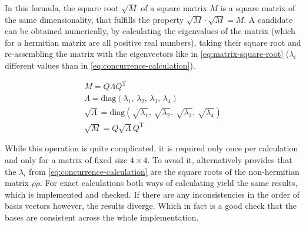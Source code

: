 In this formula, the square root $\sqrt{M}$ of a square matrix $M$ is a square matrix of the same dimensionality, that fulfills the property $\sqrt{M}\cdot \sqrt{M} = M$.
A candidate can be obtained numerically, by calculating the eigenvalues of the matrix (which for a hermitian matrix are all positive real numbers), taking their square root and re-assembling the matrix with the eigenvectors like in \autoref{eq:matrix-square-root} ($\lambda_i$ different values than in \autoref{eq:concurrence-calculation}).

\begin{equation}
    \label{eq:matrix-square-root}
    \begin{gathered}
        M  = Q \Lambda Q^\text{T}\\
        \Lambda = \text{diag}(\lambda_1,\, \lambda_2,\, \lambda_3,\, \lambda_4)\\
        \sqrt{\Lambda} = \text{diag}(\sqrt{\lambda_1},\, \sqrt{\lambda_2},\,\sqrt{\lambda_3},\,\sqrt{\lambda_4})\\
        \sqrt{M}  = Q \sqrt{\Lambda} Q^\text{T}
    \end{gathered}
\end{equation}

While this operation is quite complicated, it is required only once per calculation and only for a matrix of fixed size $4\times 4$.
To avoid it, \cite{concurrenceRewording} alternatively provides that the $\lambda_i$ from \autoref{eq:concurrence-calculation} are the square roots of the non-hermitian matrix $\rho \tilde{\rho}$.
For exact calculations both ways of calculating yield the same results, which is implemented and checked. 
If there are any inconsistencies in the order of basis vectors however, the results diverge. Which in fact is a good check that the bases are consistent across the whole implementation.
